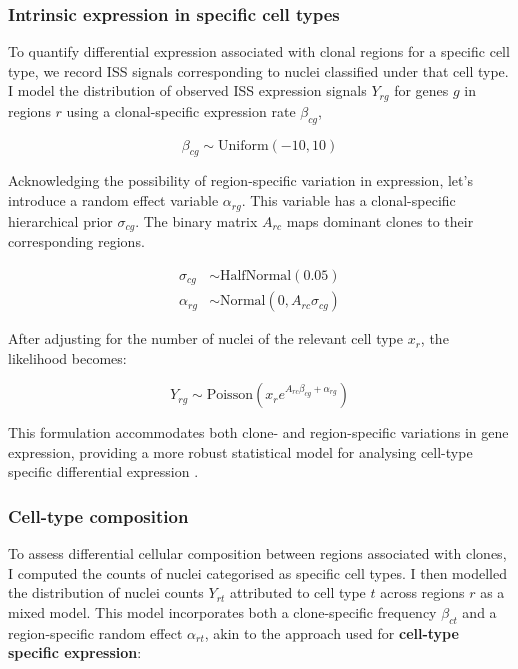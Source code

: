 \subsubsection*{Intrinsic expression in specific cell types}

To quantify differential expression associated with clonal regions for a specific cell type, we record \ac{ISS} signals corresponding to nuclei classified under that cell type. I model the distribution of observed \ac{ISS} expression signals $Y_{rg}$ for genes $g$ in regions $r$ using a clonal-specific expression rate $\beta_{cg}$,

\begin{equation}
    \beta_{cg} \sim \text{Uniform}(-10,10)
\end{equation}

Acknowledging the possibility of region-specific variation in expression, let's introduce a random effect variable $\alpha_{rg}$. This variable has a clonal-specific hierarchical prior $\sigma_{cg}$. The binary matrix $A_{rc}$ maps dominant clones to their corresponding regions.

\begin{align}
    \sigma_{cg} &\sim \text{HalfNormal}(0.05) \\
    \alpha_{rg} &\sim \text{Normal}(0, A_{rc}\sigma_{cg})
\end{align}

After adjusting for the number of nuclei of the relevant cell type 
$x_r$, the likelihood becomes:

\begin{equation}
    Y_{rg} \sim \text{Poisson}\left(x_r e^{A_{rc}\beta_{cg} + \alpha_{rg}}\right)
\end{equation}
    
This formulation accommodates both clone- and region-specific variations in gene expression, providing a more robust statistical model for analysing cell-type specific differential expression .

\subsubsection*{Cell-type composition}

To assess differential cellular composition between regions associated with clones, I computed the counts of nuclei categorised as specific cell types. I then modelled the distribution of nuclei counts $Y_{rt}$ attributed to cell type $t$ across regions $r$ as a mixed model. This model incorporates both a clone-specific frequency $\beta_{ct}$ and a region-specific random effect $\alpha_{rt}$, akin to the approach used for \textbf{cell-type specific expression}:

